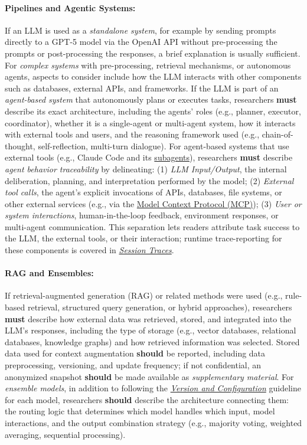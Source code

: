 \documentclass[smallextended]{svjour3}
\newcommand{\must}{\textbf{must}\xspace}
\newcommand{\should}{\textbf{should}\xspace}
\newcommand{\supplementarymaterial}{\emph{supplementary material}\xspace}
\newcommand{\supplementarymaterial}{\emph{supplementary material}\xspace}
\newcommand{\modelversion}{\hyperref[sec:report-model-version-configuration-and-customizations]{\emph{Version and Configuration}}\xspace}
\newcommand{\traces}{\hyperref[sec:report-session-traces]{\emph{Session Traces}}\xspace}
\newcommand{\modelversion}{\href{/guidelines\#report-model-version-configuration-and-customizations}{\emph{Version and Configuration}}\xspace}
\newcommand{\traces}{\href{/guidelines\#report-session-traces}{\emph{Session Traces}}\xspace}
\begin{document}
\paragraph{Pipelines and Agentic Systems:}
If an LLM is used as a \emph{standalone system}, for example by sending prompts directly to a GPT-5 model via the OpenAI API without pre-processing the prompts or post-processing the responses, a brief explanation is usually sufficient.
For \emph{complex systems} with pre-processing, retrieval mechanisms, or autonomous agents, aspects to consider include how the LLM interacts with other components such as databases, external APIs, and frameworks.
If the LLM is part of an \emph{agent-based system} that autonomously plans or executes tasks, researchers \must describe its exact architecture, including the agents' roles (e.g., planner, executor, coordinator), whether it is a single-agent or multi-agent system, how it interacts with external tools and users, and the reasoning framework used (e.g., chain-of-thought, self-reflection, multi-turn dialogue).
For agent-based systems that use external tools (e.g., Claude Code and its \href{https://docs.anthropic.com/en/docs/claude-code/sub-agents}{subagents}), researchers \must describe \emph{agent behavior traceability} by delineating: (1) \emph{LLM Input/Output}, the internal deliberation, planning, and interpretation performed by the model; (2) \emph{External tool calls}, the agent's explicit invocations of APIs, databases, file systems, or other external services (e.g., via the \href{https://modelcontextprotocol.io/}{Model Context Protocol (MCP)}); (3) \emph{User or system interactions}, human-in-the-loop feedback, environment responses, or multi-agent communication.
This separation lets readers attribute task success to the LLM, the external tools, or their interaction; runtime trace-reporting for these components is covered in \traces.

\paragraph{RAG and Ensembles:}
If retrieval-augmented generation (RAG) or related methods were used (e.g., rule-based retrieval, structured query generation, or hybrid approaches), researchers \must describe how external data was retrieved, stored, and integrated into the LLM's responses, including the type of storage (e.g., vector databases, relational databases, knowledge graphs) and how retrieved information was selected.
Stored data used for context augmentation \should be reported, including data preprocessing, versioning, and update frequency; if not confidential, an anonymized snapshot \should be made available as \supplementarymaterial.
For \emph{ensemble models}, in addition to following the \modelversion guideline for each model, researchers \should describe the architecture connecting them: the routing logic that determines which model handles which input, model interactions, and the output combination strategy (e.g., majority voting, weighted averaging, sequential processing).
\end{document}

